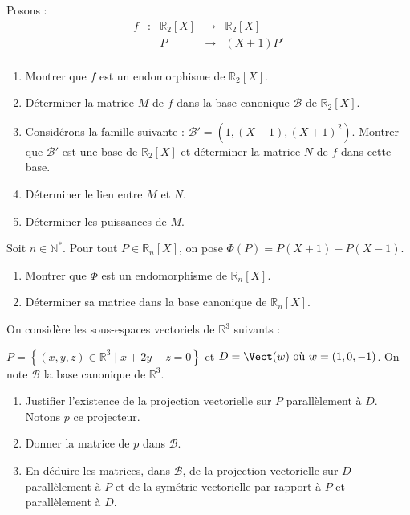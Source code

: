 \documentclass[a4paper,twoside,french,11pt]{VcCours}
\begin{document}
\begin{Exercice}{}
  Posons :
  $$ \begin{array}{ccccl}
    f & : & \mathbb{R}_2[X] & \rightarrow & \mathbb{R}_2[X] \\
    & & P & \rightarrow & (X+1)P' \\
  \end{array} $$
  \begin{enumerate}
    \item Montrer que $f$ est un endomorphisme de $ \mathbb{R}_2[X]$.
    \item Déterminer la matrice $M$ de $f$ dans la base canonique $\mathcal{B}$ de $\mathbb{R}_2[X]$.
    \item Considérons la famille suivante : $\mathcal{B}'= (1, (X+1),(X+1)^2)$. Montrer que $\mathcal{B}'$ est une base de $\mathbb{R}_2[X]$ et déterminer la matrice $N$ de $f$ dans cette base.
    \item Déterminer le lien entre $M$ et $N$.
    \item Déterminer les puissances de $M$.
  \end{enumerate}
\end{Exercice} 

\begin{Exercice}{}
  Soit $n \in \mathbb{N}^*$. Pour tout $P \in \mathbb{R}_n[X]$, on pose $\Phi(P)=P(X+1)-P(X-1)$.
  
  \begin{enumerate}
    \item Montrer que $\Phi$ est un endomorphisme de $\mathbb{R}_n[X]$.
    \item Déterminer sa matrice dans la base canonique de $\mathbb{R}_n[X]$.
  \end{enumerate}
\end{Exercice} 

\begin{Exercice}{}
  On considère les sous-espaces vectoriels de $\mathbb{R}^3 $ suivants :
  
  $P = \left\{ {(x,y,z) \in \mathbb{R}^3 \mid x + 2y - z = 0} \right\}$ et $D = \Vect (w){\text{ o\`u }}w = (1,0, - 1)$. On note $\mathcal{B}$ la base canonique de $\mathbb{R}^3 $.
  
  \begin{enumerate}
    \item Justifier l'existence de la projection vectorielle sur $P$ parallèlement à $D$. Notons $p$ ce projecteur.
    \item Donner la matrice de $p$ dans ${\mathcal{B}}$.
    \item En déduire les matrices, dans ${\mathcal{B}}$, de la projection vectorielle sur $D$ parallèlement à $P$ et de la symétrie vectorielle par rapport à $P$ et parallèlement à $D$.
  \end{enumerate}
\end{Exercice}
  
\end{document}

